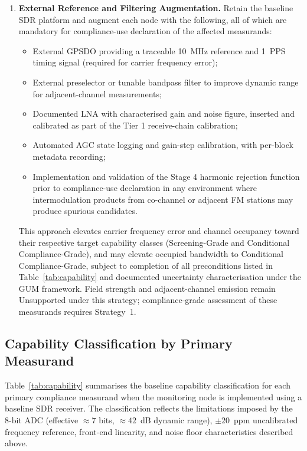 \documentclass[11pt]{article}
\begin{document}
\begin{enumerate}
\item \textbf{External Reference and Filtering Augmentation.} Retain the baseline SDR platform and augment each node with the following, all of which are mandatory for compliance-use declaration of the affected measurands:
\begin{itemize}
    \item External GPSDO providing a traceable 10~MHz reference and 1~PPS timing signal (required for carrier frequency error);
    \item External preselector or tunable bandpass filter to improve dynamic range for adjacent-channel measurements;
    \item Documented LNA with characterised gain and noise figure, inserted and calibrated as part of the Tier 1 receive-chain calibration;
    \item Automated AGC state logging and gain-step calibration, with per-block metadata recording;
    \item Implementation and validation of the Stage 4 harmonic rejection function prior to compliance-use declaration in any environment where intermodulation products from co-channel or adjacent FM stations may produce spurious candidates.
\end{itemize}
This approach elevates carrier frequency error and channel occupancy toward their respective target capability classes (Screening-Grade and Conditional Compliance-Grade), and may elevate occupied bandwidth to Conditional Compliance-Grade, subject to completion of all preconditions listed in Table~\ref{tab:capability} and documented uncertainty characterisation under the GUM framework. Field strength and adjacent-channel emission remain Unsupported under this strategy; compliance-grade assessment of these measurands requires Strategy~1.

\end{enumerate}

\subsection*{Capability Classification by Primary Measurand}

Table~\ref{tab:capability} summarises the baseline capability classification for each primary compliance measurand when the monitoring node is implemented using a baseline SDR receiver. The classification reflects the limitations imposed by the 8-bit ADC (effective $\approx 7$ bits, $\approx 42$~dB dynamic range), $\pm 20$~ppm uncalibrated frequency reference, front-end linearity, and noise floor characteristics described above.
\end{document}

